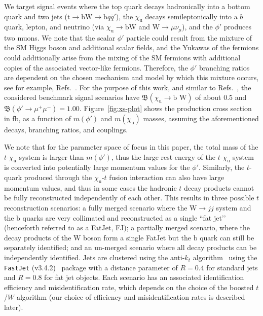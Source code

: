 We target signal events where the top quark decays hadronically into a bottom quark and two jets ($\mathrm{t} \to \mathrm{bW} \to \mathrm{b} q \bar{q}'$), the $\chi_\mathrm{u}$ decays semileptonically into a $b$ quark, lepton, and neutrino (via $\chi_\mathrm{u} \to \mathrm{bW}$ and $\mathrm{W}\to\mu\nu_{\mu}$), and the $\phi'$ produces two muons. We note that the scalar $\phi'$ particle could result from the mixture of the SM Higgs boson and additional scalar fields, and the Yukawas of the fermions could additionally arise from the mixing of the SM fermions with additional copies of the associated vector-like fermions. Therefore, the $\phi'$ branching ratios are dependent on the chosen mechanism and model by which this mixture occurs, see for example, Refs.~\parencite{Cacciapaglia_2023,Blankenburg:2012nx,Jones-Perez:2013oia,Calibbi:2009pv}. For the purpose of this work, and 
similar to Refs.~\parencite{Dutta2020,Dutta2023}, the considered benchmark signal scenarios have $\mathfrak{B}(\chi_\mathrm{u} \rightarrow \textrm{b W})$ of about 0.5 and $\mathfrak{B}(\phi' \rightarrow \mu^+\mu^-)=1.00$. Figure~\ref{fig:xs-plot} shows the production cross section in \textrm{fb}, as a function of $m(\phi')$ and $m(\chi_\mathrm{u})$ masses, assuming the aforementioned decays, branching ratios, and couplings.

We note that for the parameter space of focus in this paper, the total mass of the $t$-$\chi_\mathrm{u}$ system is larger than $m(\phi')$, thus the large rest energy of the $t$-$\chi_\mathrm{u}$ system is converted into potentially large momentum values for the $\phi'$. Similarly, the $t$-quark produced through the $\chi_\mathrm{u}$-$t$ fusion interaction can also have large momentum values, and thus in some cases the hadronic $t$ decay products cannot be fully reconstructed independently of each other. This results in three possible $t$ reconstruction scenarios: a fully merged scenario where the $\mathrm{W}\to jj$ system and the $\mathrm{b}$ quarks are very collimated and reconstructed as a single ``fat jet’’ (henceforth referred to as a FatJet, FJ); a partially merged scenario, where the decay products of the $\mathrm{W}$ boson form a single FatJet but the $\mathrm{b}$ quark can still be separately identified; and an un-merged scenario where all decay products can be independently identified. Jets are clustered using the anti-$k_t$ algorithm~\parencite{Cacciari_2008} using the \texttt{FastJet} (v3.4.2)~\parencite{Cacciari_2012} package with a distance parameter of $R = 0.4$ for standard jets and $R = 0.8$ for fat jet objects. Each scenario has an associated identification efficiency and misidentification rate, which depends on the choice of the boosted $t$/$W$ algorithm (our choice of efficiency and misidentification rates is described later). 

